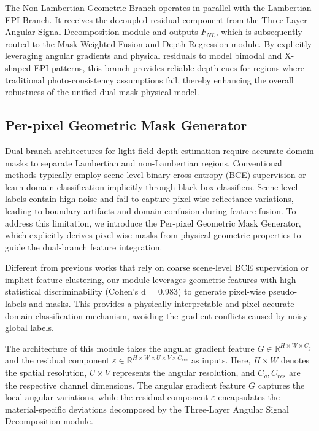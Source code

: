 \documentclass[lettersize,journal]{IEEEtran}
\begin{document}
The Non-Lambertian Geometric Branch operates in parallel with the Lambertian EPI Branch. It receives the decoupled residual component from the Three-Layer Angular Signal Decomposition module and outputs $F_{NL}$, which is subsequently routed to the Mask-Weighted Fusion and Depth Regression module. By explicitly leveraging angular gradients and physical residuals to model bimodal and X-shaped EPI patterns, this branch provides reliable depth cues for regions where traditional photo-consistency assumptions fail, thereby enhancing the overall robustness of the unified dual-mask physical model.

\subsection{Per-pixel Geometric Mask Generator}

Dual-branch architectures for light field depth estimation require accurate domain masks to separate Lambertian and non-Lambertian regions. Conventional methods typically employ scene-level binary cross-entropy (BCE) supervision or learn domain classification implicitly through black-box classifiers. Scene-level labels contain high noise and fail to capture pixel-wise reflectance variations, leading to boundary artifacts and domain confusion during feature fusion. To address this limitation, we introduce the Per-pixel Geometric Mask Generator, which explicitly derives pixel-wise masks from physical geometric properties to guide the dual-branch feature integration.

Different from previous works that rely on coarse scene-level BCE supervision or implicit feature clustering, our module leverages geometric features with high statistical discriminability (Cohen's d = 0.983) to generate pixel-wise pseudo-labels and masks. This provides a physically interpretable and pixel-accurate domain classification mechanism, avoiding the gradient conflicts caused by noisy global labels.

The architecture of this module takes the angular gradient feature $G \in \mathbb{R}^{H \times W \times C_g}$ and the residual component $\varepsilon \in \mathbb{R}^{H \times W \times U \times V \times C_{res}}$ as inputs. Here, $H \times W$ denotes the spatial resolution, $U \times V$ represents the angular resolution, and $C_g, C_{res}$ are the respective channel dimensions. The angular gradient feature $G$ captures the local angular variations, while the residual component $\varepsilon$ encapsulates the material-specific deviations decomposed by the Three-Layer Angular Signal Decomposition module.
\end{document}
